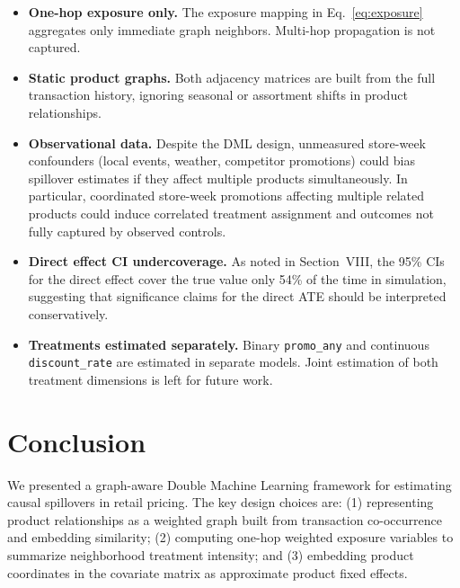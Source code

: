 \documentclass[conference]{IEEEtran}
\begin{document}
\begin{itemize}
    \item \textbf{One-hop exposure only.} The exposure mapping in
          Eq.~\eqref{eq:exposure} aggregates only immediate graph neighbors.
          Multi-hop propagation is not captured.

    \item \textbf{Static product graphs.} Both adjacency matrices are built
          from the full transaction history, ignoring seasonal or assortment
          shifts in product relationships.

    \item \textbf{Observational data.} Despite the DML design, unmeasured
          store-week confounders (local events, weather, competitor promotions)
          could bias spillover estimates if they affect multiple products
          simultaneously.
          In particular, coordinated store-week promotions affecting multiple
          related products could induce correlated treatment assignment and
          outcomes not fully captured by observed controls.

    \item \textbf{Direct effect CI undercoverage.} As noted in
          Section~VIII, the 95\% CIs for the direct effect cover the true value
          only 54\% of the time in simulation, suggesting that significance
          claims for the direct ATE should be interpreted conservatively.

    \item \textbf{Treatments estimated separately.} Binary \texttt{promo\_any}
          and continuous \texttt{discount\_rate} are estimated in separate models.
          Joint estimation of both treatment dimensions is left for future work.
\end{itemize}


\section{Conclusion}

We presented a graph-aware Double Machine Learning framework for estimating
causal spillovers in retail pricing.
The key design choices are: (1) representing product relationships as a
weighted graph built from transaction co-occurrence and embedding similarity;
(2) computing one-hop weighted exposure variables to summarize neighborhood
treatment intensity; and (3) embedding product coordinates in the covariate
matrix as approximate product fixed effects.
\end{document}
